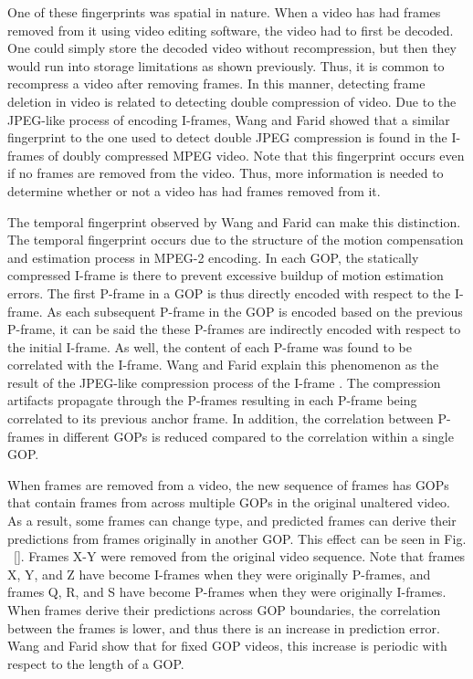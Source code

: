 One of these fingerprints was spatial in nature. When a video has had frames removed from it using video editing software, the video had to first be decoded. One could simply store the decoded video without recompression, but then they would run into storage limitations as shown previously. Thus, it is common to recompress a video after removing frames. In this manner, detecting frame deletion in video is related to detecting double compression of video. Due to the JPEG-like process of encoding I-frames, Wang and Farid showed that a similar fingerprint to the one used to detect double JPEG compression \cite{doubleJPEG} \cite{doubleJPEG2} is found in the I-frames of doubly compressed MPEG video. Note that this fingerprint occurs even if no frames are removed from the video. Thus, more information is needed to determine whether or not a video has had frames removed from it.

The temporal fingerprint observed by Wang and Farid can make this distinction. The temporal fingerprint occurs due to the structure of the motion compensation and estimation process in MPEG-2 encoding. In each GOP, the statically compressed I-frame is there to prevent excessive buildup of motion estimation errors. The first P-frame in a GOP is thus directly encoded with respect to the I-frame. As each subsequent P-frame in the GOP is encoded based on the previous P-frame, it can be said the these P-frames are indirectly encoded with respect to the initial I-frame. As well, the content of each P-frame was found to be correlated with the I-frame. Wang and Farid explain this phenomenon as the result of the JPEG-like compression process of the I-frame \cite{wang}. The compression artifacts propagate through the P-frames resulting in each P-frame being correlated to its previous anchor frame. In addition, the correlation between P-frames in different GOPs is reduced compared to the correlation within a single GOP.


When frames are removed from a video, the new sequence of frames has GOPs that contain frames from across multiple GOPs in the original unaltered video. As a result, some frames can change type, and predicted frames can derive their predictions from frames originally in another GOP. This effect can be seen in Fig. ~\ref{}. Frames X-Y were removed from the original video sequence. Note that frames X, Y, and Z have become I-frames when they were originally P-frames, and frames Q, R, and S have become P-frames when they were originally I-frames. When frames derive their predictions across GOP boundaries, the correlation between the frames is lower, and thus there is an increase in prediction error. Wang and Farid show that for fixed GOP videos, this increase is periodic with respect to the length of a GOP.

